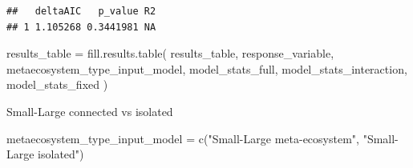 \documentclass[
]{article}
\newenvironment{Shaded}{\begin{snugshade}}{\end{snugshade}}
\newcommand{\FunctionTok}[1]{\textcolor[rgb]{0.00,0.00,0.00}{#1}}
\newcommand{\NormalTok}[1]{#1}
\newcommand{\OtherTok}[1]{\textcolor[rgb]{0.56,0.35,0.01}{#1}}
\newcommand{\StringTok}[1]{\textcolor[rgb]{0.31,0.60,0.02}{#1}}
\begin{document}
\begin{verbatim}
##   deltaAIC   p_value R2
## 1 1.105268 0.3441981 NA
\end{verbatim}

\begin{Shaded}
\begin{Highlighting}[]
\NormalTok{results\_table }\OtherTok{=} \FunctionTok{fill.results.table}\NormalTok{(}
\NormalTok{  results\_table,}
\NormalTok{  response\_variable,}
\NormalTok{  metaecosystem\_type\_input\_model,}
\NormalTok{  model\_stats\_full,}
\NormalTok{  model\_stats\_interaction,}
\NormalTok{  model\_stats\_fixed}
\NormalTok{)}
\end{Highlighting}
\end{Shaded}

Small-Large connected vs isolated

\begin{Shaded}
\begin{Highlighting}[]
\NormalTok{metaecosystem\_type\_input\_model }\OtherTok{=} \FunctionTok{c}\NormalTok{(}\StringTok{"Small{-}Large meta{-}ecosystem"}\NormalTok{,}
                                   \StringTok{"Small{-}Large isolated"}\NormalTok{)}
\end{Highlighting}
\end{Shaded}
\end{document}

